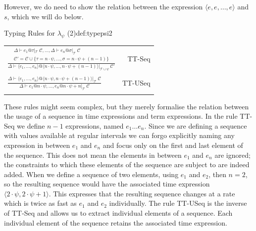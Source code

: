 However, we do need to show the relation between the expression $\langle e, e, \ldots, e \rangle$ and $s$, which we will do below.
\begin{definitiontitled}{Typing Rules for $\lambda_\psi$ (2)}{def:typepsi2}
\begin{tabularx}{\textwidth}{X r}
\centering
$ \displaystyle
  \frac{  \begin{array}{c}
            \Delta \vdash e_1 @ \tau |_\mathcal{T} \: \mathcal{C}, \ldots, \Delta \vdash e_n @ \sigma |_\mathcal{T} \: \mathcal{C}\\
            \mathcal{C}' = \mathcal{C} \cup \{ \tau = n \cdot \psi, \ldots, \sigma = n \cdot \psi + (n-1) \} 
          \end{array}}
  {\Delta \vdash \langle e_1, \ldots,  e_n \rangle @ \langle n \cdot \psi, \ldots, n \cdot \psi + (n-1) \rangle |_{\mathcal{T} \cup \psi} \: \mathcal{C}'}
$
& 
TT-Seq\\
\\

\centering
$ \displaystyle
  \frac{  \Delta \vdash \langle e_1, \ldots, e_n \rangle @ \langle n \cdot \psi, n \cdot \psi + (n-1) \rangle |_\mathcal{T} \: \mathcal{C}}
  {\Delta \vdash e_1@n \cdot \psi,\ldots, e_n @ n \cdot \psi + n |_{\mathcal{T}} \: \mathcal{C}}
$
&
TT-USeq\\
\\
\end{tabularx}
\end{definitiontitled}

These rules might seem complex, but they merely formalise the relation between the usage of a sequence in time expressions and term expressions.
In the rule TT-Seq we define $n-1$ expressions, named $e_1 \ldots e_n$. 
Since we are defining a sequence with values available at regular intervals we can forgo explicitly naming any expression in between $e_1$ and $e_n$ and focus only on the first and last element of the sequence.
This does not mean the elements in between $e_1$ and $e_n$ are ignored; the constraints to which these elements of the sequence are subject to are indeed added.
When we define a sequence of two elements, using $e_1$ and $e_2$, then $n = 2$, so the resulting sequence would have the associated time expression $\langle 2 \cdot \psi, 2 \cdot \psi + 1\rangle$.
This expresses that the resulting sequence changes at a rate which is twice as fast as $e_1$ and $e_2$ individually.
The rule TT-USeq is the inverse of TT-Seq and allows us to extract individual elements of a sequence.
Each individual element of the sequence retains the associated time expression.

